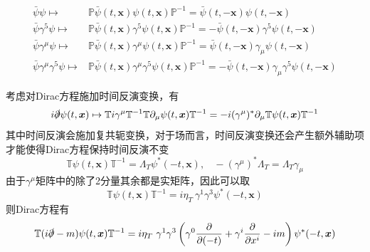 \begin{align}
    \bar{\psi}\psi\mapsto&  \mathbb{P}\bar{\psi}(t,\boldsymbol{x}){\psi}(t,\boldsymbol{x})\mathbb{P}^{-1} = \bar{\psi}(t,-\boldsymbol{x}){\psi}(t,-\boldsymbol{x})\\
    \bar{\psi}\gamma^5\psi\mapsto&  \mathbb{P}\bar{\psi}(t,\boldsymbol{x})\gamma^5{\psi}(t,\boldsymbol{x})\mathbb{P}^{-1} = -\bar{\psi}(t,-\boldsymbol{x})\gamma^5{\psi}(t,-\boldsymbol{x})\\
    \bar{\psi}\gamma^\mu\psi\mapsto&  \mathbb{P}\bar{\psi}(t,\boldsymbol{x})\gamma^\mu{\psi}(t,\boldsymbol{x})\mathbb{P}^{-1} = \bar{\psi}(t,-\boldsymbol{x})\gamma_\mu{\psi}(t,-\boldsymbol{x})\\
    \bar{\psi}\gamma^\mu\gamma^5\psi\mapsto&  \mathbb{P}\bar{\psi}(t,\boldsymbol{x})\gamma^\mu\gamma^5{\psi}(t,\boldsymbol{x})\mathbb{P}^{-1} = -\bar{\psi}(t,-\boldsymbol{x})\gamma_\mu\gamma^5{\psi}(t,-\boldsymbol{x})
\end{align}

考虑对Dirac方程施加时间反演变换，有
\begin{equation}
  i\slashed{\partial}\psi(t,\boldsymbol{x}) \mapsto \mathbb{T} i\gamma^\mu\mathbb{T}^{-1}\mathbb{T} \partial_\mu \psi(t,\boldsymbol{x}) \mathbb{T}^{-1} = -i  (\gamma^\mu)^*  \partial_\mu\mathbb{T} \psi(t,\boldsymbol{x}) \mathbb{T}^{-1}
\end{equation}
其中时间反演会施加复共轭变换，对于场而言，时间反演变换还会产生额外辅助项才能使得Dirac方程保持时间反演不变
\begin{equation}
    \mathbb{T} \psi(t,\boldsymbol{x}) \mathbb{T}^{-1} = \Lambda_T \psi^*(-t,\boldsymbol{x}),~~~~-(\gamma^\mu)^* \Lambda_T = \Lambda_T \gamma_\mu
\end{equation}
由于$\gamma^\mu$矩阵中的除了2分量其余都是实矩阵，因此可以取
\begin{equation}
    \mathbb{T} \psi(t,\boldsymbol{x}) \mathbb{T}^{-1} = i\eta_T~\gamma^1\gamma^3 \psi^*(-t,\boldsymbol{x}) 
\end{equation}
则Dirac方程有
\begin{equation}
    \mathbb{T} (i\slashed{\partial}-m)\psi(t,\boldsymbol{x}) \mathbb{T}^{-1} = i\eta_T~\gamma^1\gamma^3\left(\gamma^0\frac{\partial}{\partial(-t)}+\gamma^i\frac{\partial}{\partial x^i}  - im\right)\psi^*(-t,\boldsymbol{x})
\end{equation}

